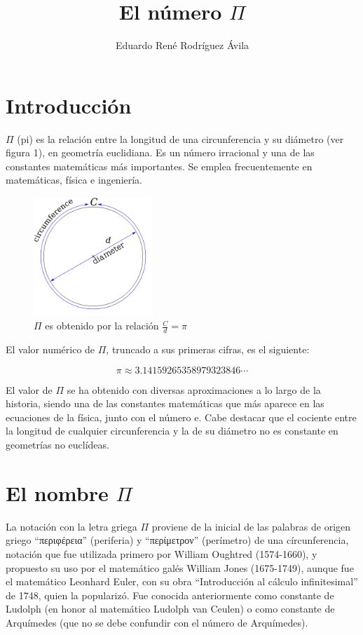 \documentclass[12pt,letterpaper]{article}
\title{El número $\Pi$}
\author{Eduardo René Rodríguez Ávila}
\begin{document}
  \maketitle

\section{Introducción}

$\Pi$ (pi) es la relación entre la longitud de una circunferencia y su diámetro (ver figura 1), en geometría euclidiana. Es un número irracional y una de las constantes matemáticas más importantes. Se emplea frecuentemente en matemáticas, física e ingeniería. 

\begin{figure}[h] 
\centering
\includegraphics[width=0.4\textwidth]{img/circ_sobre_diam.png}
\caption{$\Pi$ es obtenido por la relación $\frac{C}{d}  = \pi$}
\end{figure}

El valor numérico de $\Pi$, truncado a sus primeras cifras, es el siguiente:

\begin{displaymath}
  \pi  \approx  3.14159265358979323846 \cdots
\end{displaymath}

El valor de $\Pi$ se ha obtenido con diversas aproximaciones a lo largo de la historia, siendo una de las constantes matemáticas que más aparece en las ecuaciones de la física, junto con el número e. Cabe destacar que el co\-ciente entre la longitud de cualquier circunferencia y la de su diámetro no es constante en geometrías no euclídeas.

\section{El nombre $\Pi$}

La notación con la letra griega $\Pi$ proviene de la inicial de las palabras de origen griego ``\textgreek{περιφέρεια}'' (periferia) y ``\textgreek{περίμετρον}'' (perímetro) de una círcunferencia, notación que fue utilizada primero por William Oughtred (1574-1660), y propuesto su uso por el matemático galés William Jones (1675-1749), aunque fue el matemático Leonhard Euler, con su obra ``Introducción al cálculo infinitesimal'' de 1748, quien la popularizó. Fue conocida an\-te\-rior\-men\-te como constante de Ludolph (en honor al matemático Ludolph van Ceulen) o como constante de Arquímedes (que no se debe confundir con el número de Arquímedes).
\end{document}
